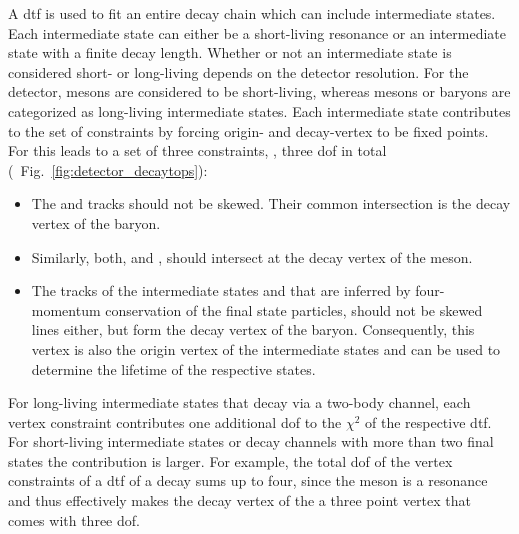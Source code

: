 A \gls{dtf} is used to fit an entire decay chain which can include intermediate states.
Each intermediate state can either be a short-living resonance or an intermediate state with a finite decay length.
Whether or not an intermediate state is considered short- or long-living depends on the detector resolution.
For the \lhcb detector, \jpsi mesons are considered to be short-living, whereas \Dz mesons or \Lz baryons are categorized as long-living intermediate states.
Each intermediate state contributes to the set of constraints by forcing origin- and decay-vertex to be fixed points.
For \decay{\Lb}{(\decay{\Dz}{\Km\pip})(\decay{\Lz}{\proton\pim})} this leads to a set of three constraints, \ie{}, three \gls{dof} in total (\cf{}~Fig.~\ref{fig:detector_decaytops}):
\begin{itemize}
    \item The \proton and \pim tracks should not be skewed. Their common intersection is the decay vertex of the \Lz baryon.
    \item Similarly, both, \Km and \pip, should intersect at the decay vertex of the \Dz meson.
    \item The tracks of the intermediate states \Lz and \Dz that are inferred by four-momentum conservation of the final state particles, should not be skewed lines either, but form the decay vertex of the \Lb baryon. Consequently, this vertex is also the origin vertex of the intermediate states and can be used to determine the lifetime of the respective states.
\end{itemize}
 
For long-living intermediate states that decay via a two-body channel, each vertex constraint contributes one additional \gls{dof} to the $\chi^2$ of the respective \gls{dtf}.
For short-living intermediate states or decay channels with more than two final states the contribution is larger.
For example, the total \gls{dof} of the vertex constraints of a \gls{dtf} of a \decay{\Lb}{(\decay{\jpsi}{\ell^+ \ell^-})(\decay{\Lz}{\proton\pim})} decay sums up to four, since the \jpsi meson is a resonance and thus effectively makes the decay vertex of the \Lb a three point vertex \decay{\Lb}{\ell^+ \ell^- \Lambda} that comes with three \gls{dof}.

